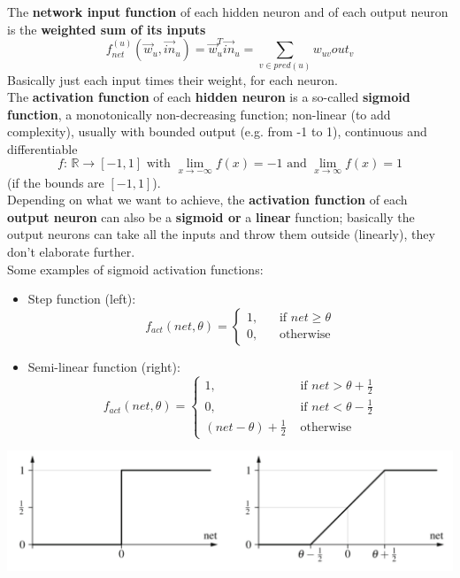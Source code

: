 \documentclass[11pt]{article}
\begin{document}
		\newpage
		
		The \textbf{network input function} of each hidden neuron and of each output neuron is the \textbf{weighted sum of its inputs}
		$$ f_{net}^{(u)} \left(\vec{w}_u, \vec{in}_u\right) = \vec{w}_u^T \vec{in}_u = \sum_{v \in pred(u)} w_{uv} out_v $$
		Basically just each input times their weight, for each neuron.\\
		
		
		The \textbf{activation function} of each \textbf{hidden neuron} is a so-called \textbf{sigmoid function}, a monotonically non-decreasing function; non-linear (to add complexity), usually with bounded output (e.g. from -1 to 1), continuous and differentiable
		$$ f: \, \mathbb{R} \rightarrow [-1, 1] \text{ with } \lim_{x \rightarrow - \infty} f(x) = -1 \text{ and } \lim_{x \rightarrow \infty} f(x) = 1 $$
		(if the bounds are $[-1, 1]$).\\
		
		Depending on what we want to achieve, the \textbf{activation function} of each \textbf{output neuron} can also be a \textbf{sigmoid or} a \textbf{linear} function; basically the output neurons can take all the inputs and throw them outside (linearly), they don't elaborate further.\\
		
		Some examples of sigmoid activation functions:
		\begin{itemize}
			\item Step function (left):
			$$ f_{act} (net, \theta) = \begin{cases}
				1, \;\; & \text{ if } net \geq \theta \\
				0, & \text{ otherwise}
			\end{cases} $$
			\item Semi-linear function (right):
			$$ f_{act} (net, \theta) = \begin{cases}
				1, \;\; & \text{ if } net > \theta + \frac{1}{2} \\
				0, & \text{ if } net < \theta - \frac{1}{2} \\
				(net - \theta) + \frac{1}{2} & \text{ otherwise}
			\end{cases} $$
		\end{itemize}
		\begin{center}
			\includegraphics[width=0.9\columnwidth]{img/NN/sigmoid1}
		\end{center}
		
\end{document}
